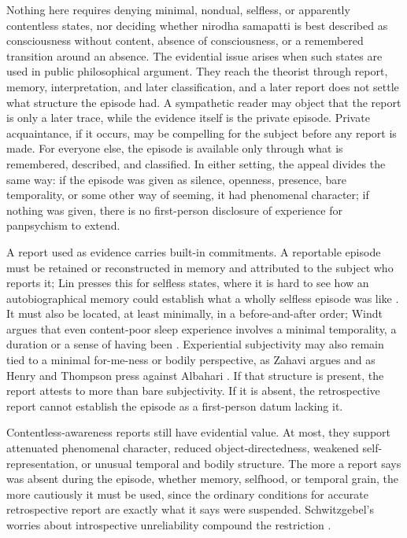 Nothing here requires denying minimal, nondual, selfless, or apparently contentless states, nor deciding whether nirodha samapatti is best described as consciousness without content, absence of consciousness, or a remembered transition around an absence. The evidential issue arises when such states are used in public philosophical argument. They reach the theorist through report, memory, interpretation, and later classification, and a later report does not settle what structure the episode had. A sympathetic reader may object that the report is only a later trace, while the evidence itself is the private episode. Private acquaintance, if it occurs, may be compelling for the subject before any report is made. For everyone else, the episode is available only through what is remembered, described, and classified. In either setting, the appeal divides the same way: if the episode was given as silence, openness, presence, bare temporality, or some other way of seeming, it had phenomenal character; if nothing was given, there is no first-person disclosure of experience for panpsychism to extend.

A report used as evidence carries built-in commitments. A reportable episode must be retained or reconstructed in memory and attributed to the subject who reports it; Lin presses this for selfless states, where it is hard to see how an autobiographical memory could establish what a wholly selfless episode was like \citep{lin2022selfless}. It must also be located, at least minimally, in a before-and-after order; Windt argues that even content-poor sleep experience involves a minimal temporality, a duration or a sense of having been \citep{windt2015}. Experiential subjectivity may also remain tied to a minimal for-me-ness or bodily perspective, as Zahavi argues and as Henry and Thompson press against Albahari \citep{zahavi2005,henryThompson2011}. If that structure is present, the report attests to more than bare subjectivity. If it is absent, the retrospective report cannot establish the episode as a first-person datum lacking it.

Contentless-awareness reports still have evidential value. At most, they support attenuated phenomenal character, reduced object-directedness, weakened self-representation, or unusual temporal and bodily structure. The more a report says was absent during the episode, whether memory, selfhood, or temporal grain, the more cautiously it must be used, since the ordinary conditions for accurate retrospective report are exactly what it says were suspended. Schwitzgebel's worries about introspective unreliability compound the restriction \citep{schwitzgebel2008,schwitzgebel2011}.

